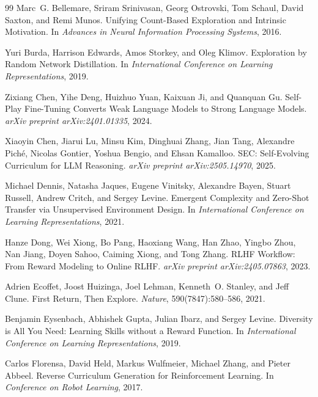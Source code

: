 \documentclass{article}
\begin{document}
\begin{thebibliography}{99}
Marc~G. Bellemare, Sriram Srinivasan, Georg Ostrovski, Tom Schaul, David Saxton, and Remi Munos.
\newblock Unifying Count-Based Exploration and Intrinsic Motivation.
\newblock In \emph{Advances in Neural Information Processing Systems}, 2016.

Yuri Burda, Harrison Edwards, Amos Storkey, and Oleg Klimov.
\newblock Exploration by Random Network Distillation.
\newblock In \emph{International Conference on Learning Representations}, 2019.

Zixiang Chen, Yihe Deng, Huizhuo Yuan, Kaixuan Ji, and Quanquan Gu.
\newblock Self-Play Fine-Tuning Converts Weak Language Models to Strong Language Models.
\newblock \emph{arXiv preprint arXiv:2401.01335}, 2024.

Xiaoyin Chen, Jiarui Lu, Minsu Kim, Dinghuai Zhang, Jian Tang, Alexandre Pich\'e, Nicolas Gontier, Yoshua Bengio, and Ehsan Kamalloo.
\newblock SEC: Self-Evolving Curriculum for LLM Reasoning.
\newblock \emph{arXiv preprint arXiv:2505.14970}, 2025.

Michael Dennis, Natasha Jaques, Eugene Vinitsky, Alexandre Bayen, Stuart Russell, Andrew Critch, and Sergey Levine.
\newblock Emergent Complexity and Zero-Shot Transfer via Unsupervised Environment Design.
\newblock In \emph{International Conference on Learning Representations}, 2021.

Hanze Dong, Wei Xiong, Bo Pang, Haoxiang Wang, Han Zhao, Yingbo Zhou, Nan Jiang, Doyen Sahoo, Caiming Xiong, and Tong Zhang.
\newblock RLHF Workflow: From Reward Modeling to Online RLHF.
\newblock \emph{arXiv preprint arXiv:2405.07863}, 2023.

Adrien Ecoffet, Joost Huizinga, Joel Lehman, Kenneth~O. Stanley, and Jeff Clune.
\newblock First Return, Then Explore.
\newblock \emph{Nature}, 590(7847):580--586, 2021.

Benjamin Eysenbach, Abhishek Gupta, Julian Ibarz, and Sergey Levine.
\newblock Diversity is All You Need: Learning Skills without a Reward Function.
\newblock In \emph{International Conference on Learning Representations}, 2019.

Carlos Florensa, David Held, Markus Wulfmeier, Michael Zhang, and Pieter Abbeel.
\newblock Reverse Curriculum Generation for Reinforcement Learning.
\newblock In \emph{Conference on Robot Learning}, 2017.


\end{thebibliography}
\end{document}
